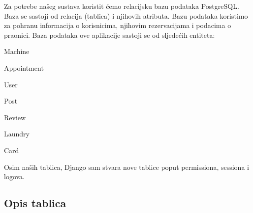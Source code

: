 				
		\noindent Za potrebe našeg sustava koristit ćemo relacijsku bazu podataka PostgreSQL.
		Baza se sastoji od relacija (tablica) i njihovih atributa. Bazu podataka koristimo za pohranu informacija o korisnicima, njihovim rezervacijama i podacima o praonici.
		Baza podataka ove aplikacije sastoji se od sljedećih entiteta:
		\begin{packed_item}
			\item 	Machine
			\item 	Appointment
			\item 	User
			\item 	Post
			\item 	Review
			\item 	Laundry
			\item 	Card
		\end{packed_item}	
	
		\noindent Osim naših tablica, Django sam stvara nove tablice poput permissiona, sessiona i logova.
		
			\subsection{Opis tablica}
			
